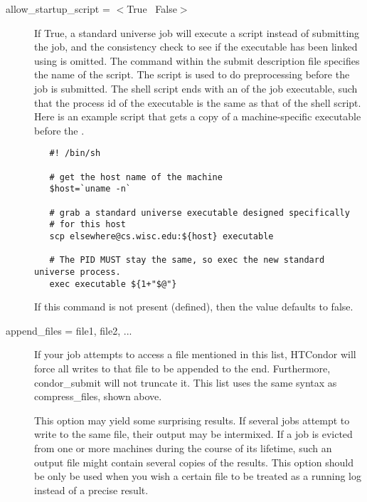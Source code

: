 \begin{description} 

\label{condor-submit-allow-startup-script}
\item[allow\_startup\_script = $<$True \Bar\ False$>$]
If True, a standard universe job will execute a script
instead of submitting the job,
and the consistency check to see if the executable has
been linked using  is omitted.
The  command within the submit description
file specifies the name of the script.
The script is used to do preprocessing before the
job is submitted.
The shell script ends with an  of the
job executable, such that the process id of the executable is the
same as that of the shell script.
Here is an example script that gets a copy of a machine-specific
executable before the .
\footnotesize
\begin{verbatim} 
   #! /bin/sh

   # get the host name of the machine
   $host=`uname -n`

   # grab a standard universe executable designed specifically
   # for this host
   scp elsewhere@cs.wisc.edu:${host} executable

   # The PID MUST stay the same, so exec the new standard universe process.
   exec executable ${1+"$@"}
\end{verbatim} 
\normalsize
If this command is not present (defined), then the value
defaults to false.


\label{condor-submit-append-files}
\item[append\_files = file1, file2, ...]

If your job attempts to access a file mentioned in this list,
HTCondor will force all writes to that file to be appended to the end.
Furthermore, condor\_submit will not truncate it.
This list uses the same syntax as compress\_files, shown above.

This option may yield some surprising results.  If several
jobs attempt to write to the same file, their output may be intermixed.
If a job is evicted from one or more machines during the course of its
lifetime, such an output file might contain several copies of the results.
This option should be only be used when you wish a certain file to be
treated as a running log instead of a precise result.


\end{description}

